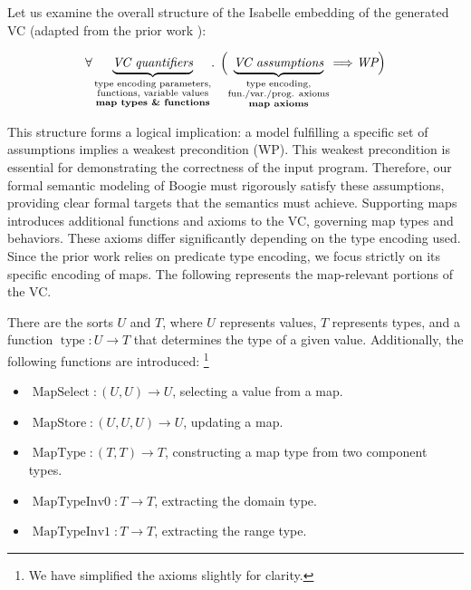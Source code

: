 Let us examine the overall structure of the Isabelle embedding of the generated VC
(adapted from the prior work \cite{parthasarathy2021formally}):


\[
\forall
\underbrace{\textit{VC quantifiers}}_{\substack{
  \text{type encoding parameters,}\\
  \text{functions, variable values}\\
  \textbf{map types \& functions}}}
\mathpunct{.}\;
\Bigl(
\underbrace{\textit{VC assumptions}}_{\substack{
  \text{type encoding,}\\
  \text{fun./var./prog. axioms}\\
  \textbf{map axioms}}}
\Longrightarrow
\textit{WP}
\Bigr)
\]


This structure forms a logical implication:
a model fulfilling a specific set of assumptions implies a weakest precondition (WP).
This weakest precondition is essential for demonstrating the correctness of the input program.
Therefore, our formal semantic modeling of Boogie must rigorously satisfy these assumptions,
providing clear formal targets that the semantics must achieve.
Supporting maps introduces additional functions and axioms to the VC,
governing map types and behaviors.
These axioms differ significantly depending on the type encoding used.
Since the prior work relies on predicate type encoding,
we focus strictly on its specific encoding of maps.
The following represents the map-relevant portions of the VC.


\providecommand{\MapType}{\operatorname{MapType}}
\providecommand{\MapTypeInvK}{\operatorname{MapTypeInv0}}
\providecommand{\MapTypeInvV}{\operatorname{MapTypeInv1}}
\providecommand{\Select}{\operatorname{MapSelect}}
\providecommand{\Store}{\operatorname{MapStore}}
\providecommand{\type}{\operatorname{type}}


There are the sorts $U$ and $T$, where $U$ represents values, $T$ represents types,
and a function $\type : U \rightarrow T$ that determines the type of a given value.
Additionally, the following functions are introduced:
\footnote{We have simplified the axioms slightly for clarity.}
\begin{itemize} 
  \item $\Select : (U, U) \rightarrow U$, selecting a value from a map.
  \item $\Store : (U, U, U) \rightarrow U$, updating a map.
  \item $\MapType : (T, T) \rightarrow T$, constructing a map type from two component types.
  \item $\MapTypeInvK : T \rightarrow T$, extracting the domain type.
  \item $\MapTypeInvV : T \rightarrow T$, extracting the range type.
\end{itemize} 

